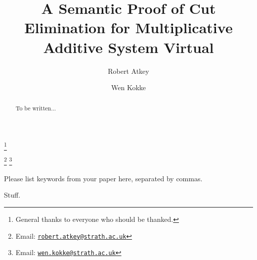 \documentclass[twoside,11pt]{entics}
\begin{document}
\begin{frontmatter}
  \title{A Semantic Proof of Cut Elimination for Multiplicative Additive System Virtual}
  \thanks[ALL]{General thanks to everyone who should be thanked.}
  \author{Robert Atkey}
  \author{Wen Kokke}
  \address[msp]{University of Strathclyde\\Glasgow, Scotland, UK}
  \thanks[bobemail]%
  {Email: \href{robert.atkey@strath.ac.uk}%
    {\texttt{\normalshape robert.atkey@strath.ac.uk}}}
  \thanks[wenemail]%
  {Email: \href{wen.kokke@strath.ac.uk}%
    {\texttt{\normalshape wen.kokke@strath.ac.uk}}}
  \begin{abstract}
    To be written...
  \end{abstract}
  \begin{keyword}
    Please list keywords from your paper here, separated by commas.
  \end{keyword}
\end{frontmatter}

Stuff.

\cite{Horne15:mav,Okada99:psc}



\end{document}

